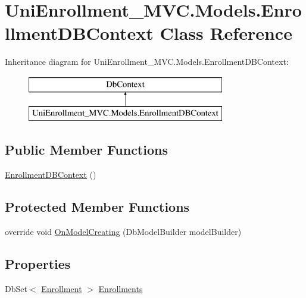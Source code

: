 \hypertarget{class_uni_enrollment___m_v_c_1_1_models_1_1_enrollment_d_b_context}{}\section{Uni\+Enrollment\+\_\+\+M\+V\+C.\+Models.\+Enrollment\+D\+B\+Context Class Reference}
\label{class_uni_enrollment___m_v_c_1_1_models_1_1_enrollment_d_b_context}
Inheritance diagram for Uni\+Enrollment\+\_\+\+M\+V\+C.\+Models.\+Enrollment\+D\+B\+Context\+:\begin{figure}[H]
\begin{center}
\leavevmode
\includegraphics[height=2.000000cm]{class_uni_enrollment___m_v_c_1_1_models_1_1_enrollment_d_b_context}
\end{center}
\end{figure}
\subsection*{Public Member Functions}
\begin{DoxyCompactItemize}
\item 
\hyperlink{class_uni_enrollment___m_v_c_1_1_models_1_1_enrollment_d_b_context_a9bd979c7d54be8c4309092b71ad85079}{Enrollment\+D\+B\+Context} ()
\end{DoxyCompactItemize}
\subsection*{Protected Member Functions}
\begin{DoxyCompactItemize}
\item 
override void \hyperlink{class_uni_enrollment___m_v_c_1_1_models_1_1_enrollment_d_b_context_ac3e2f48ce2f4ff5f625f4e8df1ed9dab}{On\+Model\+Creating} (Db\+Model\+Builder model\+Builder)
\end{DoxyCompactItemize}
\subsection*{Properties}
\begin{DoxyCompactItemize}
\item 
Db\+Set$<$ \hyperlink{class_uni_enrollment___m_v_c_1_1_models_1_1_enrollment}{Enrollment} $>$ \hyperlink{class_uni_enrollment___m_v_c_1_1_models_1_1_enrollment_d_b_context_a17731fb975cd9c9b7349a874fc629490}{Enrollments}
\end{DoxyCompactItemize}


